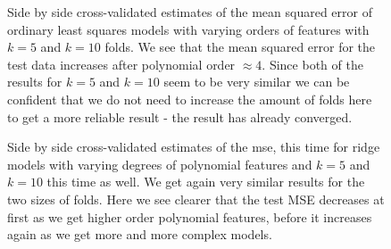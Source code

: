 \documentclass{article}
\begin{document}
\begin{figure}
    \centering
    \quad
    \caption{Side by side cross-validated estimates of the mean squared error of
        ordinary least squares models with varying orders of features with $k=5$ and
        $k=10$ folds. We see that the mean squared error for the test data
        increases after polynomial order $\approx 4$. Since both of the results for
        $k=5$ and $k=10$ seem to be very similar we can be confident that we do not
        need to increase the amount of folds here to get a more reliable result
        - the result has already converged.}
    \label{crossval-ols}
\end{figure}
\begin{figure}
    \centering
    \quad
    \caption{Side by side cross-validated estimates of the mse, this time for
        ridge models with varying degrees of polynomial features and $k=5$ and
        $k=10$ this time as well. We get again very similar results for the two
        sizes of folds. Here we see clearer that the test MSE decreases at first as
        we get higher order polynomial features, before it increases again as we get
        more and more complex models.}
    \label{crossval-ridge}
\end{figure}
\end{document}
